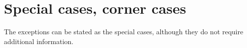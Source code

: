 \section{Special cases, corner cases}

The exceptions can be stated as the special cases, although they do not require additional information. 